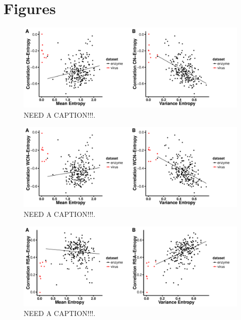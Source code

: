 \documentclass[12pt]{article}
\begin{document}



\cleardoublepage
\section*{Figures}

    \begin{figure}[H]
            \centerline{\includegraphics[width=7.5in]{entropy_cn_cor.pdf}}     
            \caption{NEED A CAPTION!!!.}
            \label{fig:seqent_structure_cors}
    \end{figure}


    \begin{figure}[H]
            \centerline{\includegraphics[width=7.5in]{entropy_wcn_cor.pdf}}     
            \caption{NEED A CAPTION!!!.}
            \label{fig:seqent_structure_cors}
    \end{figure}


    \begin{figure}[H]
            \centerline{\includegraphics[width=7.5in]{entropy_rsa_cor.pdf}}     
            \caption{NEED A CAPTION!!!.}
            \label{fig:seqent_structure_cors}
    \end{figure}
  
\end{document}
